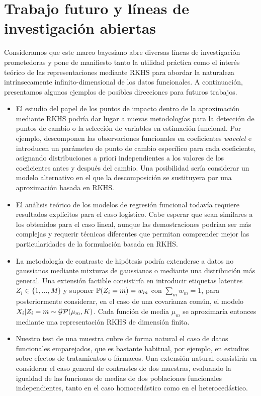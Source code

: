 \section{Trabajo futuro y líneas de investigación abiertas}

Consideramos que este marco bayesiano abre diversas líneas de investigación prometedoras y pone de manifiesto tanto la utilidad práctica como el interés teórico de las representaciones mediante \acs{RKHS} para abordar la naturaleza intrínsecamente infinito-dimensional de los datos funcionales. A continuación, presentamos algunos ejemplos de posibles direcciones para futuros trabajos.

\begin{itemize}
    \item El estudio del papel de los puntos de impacto dentro de la aproximación mediante \acs{RKHS} podría dar lugar a nuevas metodologías para la detección de puntos de cambio o la selección de variables en estimación funcional. Por ejemplo, \citet{li2021bayesian} descomponen las observaciones funcionales en coeficientes \textit{wavelet} e introducen un parámetro de punto de cambio específico para cada coeficiente, asignando distribuciones a priori independientes a los valores de los coeficientes antes y después del cambio. Una posibilidad sería considerar un modelo alternativo en el que la descomposición se sustituyera por una aproximación basada en \acs{RKHS}.
    \item El análisis teórico de los modelos de regresión funcional todavía requiere resultados explícitos para el caso logístico. Cabe esperar que sean similares a los obtenidos para el caso lineal, aunque las demostraciones podrían ser más complejas y requerir técnicas diferentes que permitan comprender mejor las particularidades de la formulación basada en \acs{RKHS}.
    \item La metodología de contraste de hipótesis podría extenderse a datos no gaussianos mediante mixturas de gaussianas o mediante una distribución más general. Una extensión factible consistiría en introducir etiquetas latentes \(Z_i\in\{1,\dots,M\}\) y suponer \(\mathbb{P}(Z_i=m)=w_m\) con \(\sum_m w_m=1\), para posteriormente considerar, en el caso de una covarianza común, el modelo \(X_i| Z_i=m\sim\operatorname{\mathcal{GP}}(\mu_m,K)\). Cada función de media \(\mu_m\) se aproximaría entonces mediante una representación \acs{RKHS} de dimensión finita.
    \item Nuestro test de una muestra cubre de forma natural el caso de datos funcionales emparejados, que es bastante habitual, por ejemplo, en estudios sobre efectos de tratamientos o fármacos. Una extensión natural consistiría en considerar el caso general de contrastes de dos muestras, evaluando la igualdad de las funciones de medias de dos poblaciones funcionales independientes, tanto en el caso homocedástico como en el heterocedástico.

\end{itemize}
